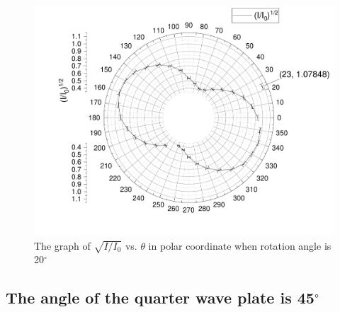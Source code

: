 \documentclass{my_template}
\begin{document}
    \begin{figure}[!ht]
        \centering
        \includegraphics[width=\textwidth]{fig/quarter20.pdf}
        \caption{The graph of $\sqrt{I/I_0}$ vs. $\theta$ in polar coordinate when rotation angle is 20$^\circ$}
        \label{fig:quarter20}
    \end{figure}
    \subsection{The angle of the quarter wave plate is 45$^\circ$}\label{sec:45}
\end{document}
